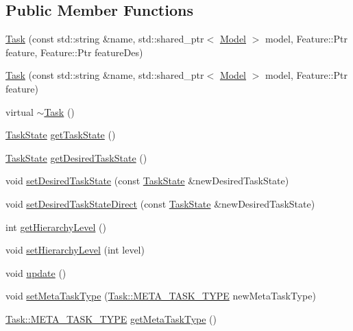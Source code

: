 \subsection*{Public Member Functions}
\begin{DoxyCompactItemize}
\item 
\hyperlink{classocra_1_1Task_abf071538753cbbc6af21f98644d978cc}{Task} (const std\+::string \&name, std\+::shared\+\_\+ptr$<$ \hyperlink{classocra_1_1Model}{Model} $>$ model, Feature\+::\+Ptr feature, Feature\+::\+Ptr feature\+Des)
\item 
\hyperlink{classocra_1_1Task_ace0cba5936451a6423e8f341746adfd3}{Task} (const std\+::string \&name, std\+::shared\+\_\+ptr$<$ \hyperlink{classocra_1_1Model}{Model} $>$ model, Feature\+::\+Ptr feature)
\item 
virtual \hyperlink{classocra_1_1Task_a3949d2c52bc43f373b8cc039da304b87}{$\sim$\+Task} ()
\item 
\hyperlink{classocra_1_1TaskState}{Task\+State} \hyperlink{classocra_1_1Task_a81def8087dc41ef0a02406f208be4833}{get\+Task\+State} ()
\item 
\hyperlink{classocra_1_1TaskState}{Task\+State} \hyperlink{classocra_1_1Task_a22cb1cd88dda7477d2594b9851f86301}{get\+Desired\+Task\+State} ()
\item 
void \hyperlink{classocra_1_1Task_ac14252b35faa2ed8eed4cc5db629ce94}{set\+Desired\+Task\+State} (const \hyperlink{classocra_1_1TaskState}{Task\+State} \&new\+Desired\+Task\+State)
\item 
void \hyperlink{classocra_1_1Task_a44ccc493a8a4931e11c3fcfcd30d991c}{set\+Desired\+Task\+State\+Direct} (const \hyperlink{classocra_1_1TaskState}{Task\+State} \&new\+Desired\+Task\+State)
\item 
int \hyperlink{classocra_1_1Task_a244bb1942ffb8788fd7b8dba560f5b09}{get\+Hierarchy\+Level} ()
\item 
void \hyperlink{classocra_1_1Task_a07617befcfa5bf8f0711d47965ed8337}{set\+Hierarchy\+Level} (int level)
\item 
void \hyperlink{classocra_1_1Task_ad15d68848234ddac27ea57af1915045f}{update} ()
\item 
void \hyperlink{classocra_1_1Task_a0e4fc6a68b13d3b70798db1ff7233faf}{set\+Meta\+Task\+Type} (\hyperlink{classocra_1_1Task_a8ddf2840d178ca273e886c9ca95248fe}{Task\+::\+M\+E\+T\+A\+\_\+\+T\+A\+S\+K\+\_\+\+T\+Y\+PE} new\+Meta\+Task\+Type)
\item 
\hyperlink{classocra_1_1Task_a8ddf2840d178ca273e886c9ca95248fe}{Task\+::\+M\+E\+T\+A\+\_\+\+T\+A\+S\+K\+\_\+\+T\+Y\+PE} \hyperlink{classocra_1_1Task_a89d970771d25b28149d51768f37118d5}{get\+Meta\+Task\+Type} ()

\end{DoxyCompactItemize}
